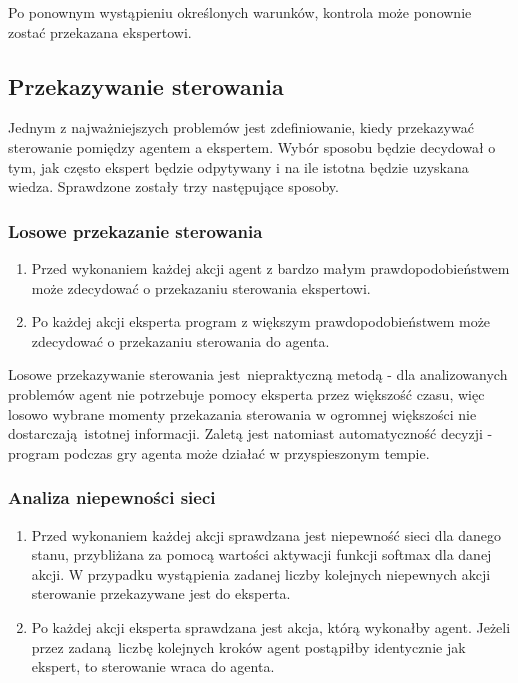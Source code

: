 Po ponownym wystąpieniu określonych warunków, kontrola może ponownie zostać przekazana ekspertowi.

\subsection{Przekazywanie sterowania}
Jednym z najważniejszych problemów jest zdefiniowanie, kiedy przekazywać sterowanie pomiędzy agentem a ekspertem. Wybór sposobu będzie decydował o tym, jak często ekspert będzie odpytywany i na ile istotna będzie uzyskana wiedza. Sprawdzone zostały trzy następujące sposoby.

\subsubsection{Losowe przekazanie sterowania}
\begin{enumerate}
\item Przed wykonaniem każdej akcji agent z bardzo małym prawdopodobieństwem może zdecydować o przekazaniu sterowania ekspertowi.
\item Po każdej akcji eksperta program z większym prawdopodobieństwem może zdecydować o przekazaniu sterowania do agenta.
\end{enumerate}

Losowe przekazywanie sterowania jest niepraktyczną metodą - dla analizowanych problemów agent nie potrzebuje pomocy eksperta przez większość czasu, więc losowo wybrane momenty przekazania sterowania w ogromnej większości nie dostarczają istotnej informacji. Zaletą jest natomiast automatyczność decyzji - program podczas gry agenta może działać w przyspieszonym tempie.

\subsubsection{Analiza niepewności sieci}
\begin{enumerate}
\item Przed wykonaniem każdej akcji sprawdzana jest niepewność sieci dla danego stanu, przybliżana za pomocą wartości aktywacji funkcji softmax dla danej akcji. W przypadku wystąpienia zadanej liczby kolejnych niepewnych akcji sterowanie przekazywane jest do eksperta.
\item Po każdej akcji eksperta sprawdzana jest akcja, którą wykonałby agent. Jeżeli przez zadaną liczbę kolejnych kroków agent postąpiłby identycznie jak ekspert, to sterowanie wraca do agenta.
\end{enumerate}

